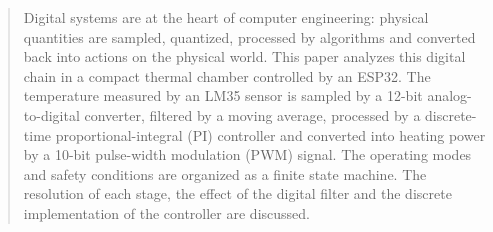 \begin{abstract}
Digital systems are at the heart of computer engineering: physical quantities are sampled,
quantized, processed by algorithms and converted back into actions on the physical world. This
paper analyzes this digital chain in a compact thermal chamber controlled by an ESP32. The
temperature measured by an LM35 sensor is sampled by a 12-bit analog-to-digital converter, filtered
by a moving average, processed by a discrete-time proportional-integral (PI) controller and
converted into heating power by a 10-bit pulse-width modulation (PWM) signal. The operating modes
and safety conditions are organized as a finite state machine. The resolution of each stage, the
effect of the digital filter and the discrete implementation of the controller are discussed.
\end{abstract}

